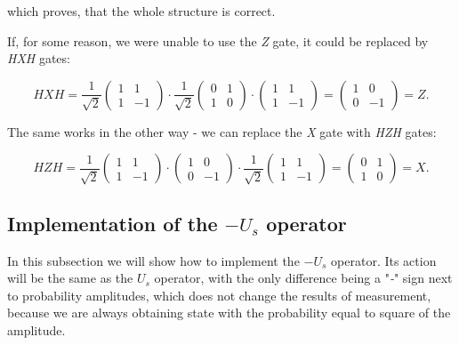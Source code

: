 which proves, that the whole structure is correct.

\begin{remark}
If, for some reason, we were unable to use the \textit{Z} gate, it could be replaced by \textit{HXH} gates:

\[ HXH = \frac{1}{\sqrt{2}} \begin{pmatrix} 1 & 1 \\ 1 & -1 \end{pmatrix} \cdot \frac{1}{\sqrt{2}}\begin{pmatrix} 0 & 1 \\ 1 & 0 \end{pmatrix} \cdot \begin{pmatrix} 1 & 1 \\ 1 & -1 \end{pmatrix} = \begin{pmatrix} 1 & 0 \\ 0 & -1 \end{pmatrix} = Z.\]

The same works in the other way - we can replace the \textit{X} gate with \textit{HZH} gates:

\[ HZH = \frac{1}{\sqrt{2}} \begin{pmatrix} 1 & 1 \\ 1 & -1 \end{pmatrix} \cdot \begin{pmatrix} 1 & 0 \\ 0 & -1 \end{pmatrix} \cdot \frac{1}{\sqrt{2}} \begin{pmatrix} 1 & 1 \\ 1 & -1 \end{pmatrix} = \begin{pmatrix} 0 & 1 \\ 1 & 0 \end{pmatrix} = X.\]

\end{remark}

\subsection{Implementation of the $-U_s$ operator}

In this subsection we will show how to implement the $-U_s$ operator. Its action will be the same as the $U_s$ operator, with the only difference being a "\textit{-}" sign next to probability amplitudes, which does not change the results of measurement, because we are always obtaining state with the probability equal to square of the amplitude.

